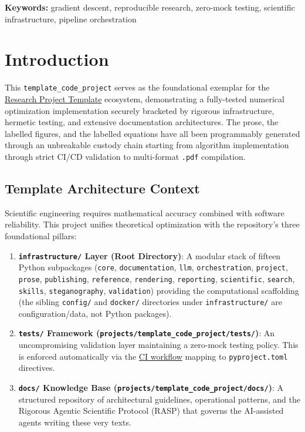 \documentclass[
]{article}
\providecommand{\tightlist}{%
  \setlength{\itemsep}{0pt}\setlength{\parskip}{0pt}}
\begin{document}
\textbf{Keywords:} gradient descent, reproducible research, zero-mock
testing, scientific infrastructure, pipeline orchestration

\newpage

\section{Introduction}\label{sec:introduction}

This \texttt{template\_code\_project} serves as the foundational
exemplar for the \href{https://github.com/docxology/template}{Research
Project Template} ecosystem, demonstrating a fully-tested numerical
optimization implementation securely bracketed by rigorous
infrastructure, hermetic testing, and extensive documentation
architectures. The prose, the labelled figures, and the labelled
equations have all been programmably generated through an unbreakable
custody chain starting from algorithm implementation through strict
CI/CD validation to multi-format \texttt{.pdf} compilation.

\subsection{Template Architecture
Context}\label{template-architecture-context}

Scientific engineering requires mathematical accuracy combined with
software reliability. This project unifies theoretical optimization with
the repository's three foundational pillars:

\begin{enumerate}
\def\labelenumi{\arabic{enumi}.}
\tightlist
\item
  \textbf{\texttt{infrastructure/} Layer (Root Directory)}: A modular
  stack of fifteen Python subpackages (\texttt{core},
  \texttt{documentation}, \texttt{llm}, \texttt{orchestration},
  \texttt{project}, \texttt{prose}, \texttt{publishing},
  \texttt{reference}, \texttt{rendering}, \texttt{reporting},
  \texttt{scientific}, \texttt{search}, \texttt{skills},
  \texttt{steganography}, \texttt{validation}) providing the
  computational scaffolding (the sibling \texttt{config/} and
  \texttt{docker/} directories under \texttt{infrastructure/} are
  configuration/data, not Python packages).
\item
  \textbf{\texttt{tests/} Framework
  (\texttt{projects/template\_code\_project/tests/})}: An uncompromising
  validation layer maintaining a zero-mock testing policy. This is
  enforced automatically via the
  \href{https://github.com/docxology/template/blob/main/.github/workflows/ci.yml}{CI
  workflow} mapping to \texttt{pyproject.toml} directives.
\item
  \textbf{\texttt{docs/} Knowledge Base
  (\texttt{projects/template\_code\_project/docs/})}: A structured
  repository of architectural guidelines, operational patterns, and the
  Rigorous Agentic Scientific Protocol (RASP) that governs the
  AI-assisted agents writing these very texts.
\end{enumerate}
\end{document}
